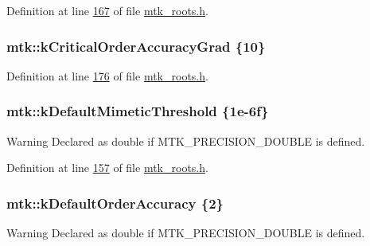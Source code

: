 Definition at line \hyperlink{mtk__roots_8h_source_l00167}{167} of file \hyperlink{mtk__roots_8h_source}{mtk\+\_\+roots.\+h}.

\hypertarget{group__c01-roots_ga295dd2f403c775ecd942c22b5a777496}{
\subsubsection[{k\+Critical\+Order\+Accuracy\+Grad}]{\setlength{\rightskip}{0pt plus 5cm}mtk\+::k\+Critical\+Order\+Accuracy\+Grad \{10\}}}\label{group__c01-roots_ga295dd2f403c775ecd942c22b5a777496}


Definition at line \hyperlink{mtk__roots_8h_source_l00176}{176} of file \hyperlink{mtk__roots_8h_source}{mtk\+\_\+roots.\+h}.

\hypertarget{group__c01-roots_ga35718d949bdc81a08a9cc8ebbe3478a2}{
\subsubsection[{k\+Default\+Mimetic\+Threshold}]{\setlength{\rightskip}{0pt plus 5cm}mtk\+::k\+Default\+Mimetic\+Threshold \{1e-\/6f\}}}\label{group__c01-roots_ga35718d949bdc81a08a9cc8ebbe3478a2}
\begin{DoxyWarning}{Warning}
Declared as double if M\+T\+K\+\_\+\+P\+R\+E\+C\+I\+S\+I\+O\+N\+\_\+\+D\+O\+U\+B\+L\+E is defined. 
\end{DoxyWarning}


Definition at line \hyperlink{mtk__roots_8h_source_l00157}{157} of file \hyperlink{mtk__roots_8h_source}{mtk\+\_\+roots.\+h}.

\hypertarget{group__c01-roots_ga0d95560098eb36420511103637b6952f}{
\subsubsection[{k\+Default\+Order\+Accuracy}]{\setlength{\rightskip}{0pt plus 5cm}mtk\+::k\+Default\+Order\+Accuracy \{2\}}}\label{group__c01-roots_ga0d95560098eb36420511103637b6952f}
\begin{DoxyWarning}{Warning}
Declared as double if M\+T\+K\+\_\+\+P\+R\+E\+C\+I\+S\+I\+O\+N\+\_\+\+D\+O\+U\+B\+L\+E is defined. 
\end{DoxyWarning}


